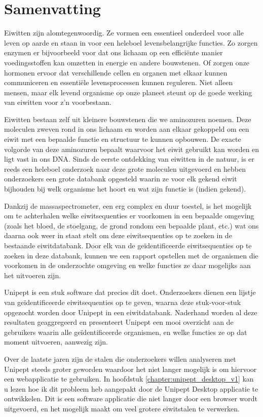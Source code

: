 \chapter*{Samenvatting}

Eiwitten zijn alomtegenwoordig.
Ze vormen een essentieel onderdeel voor alle leven op aarde en staan in voor een heleboel levensbelangrijke functies.
Zo zorgen enzymen er bijvoorbeeld voor dat ons lichaam op een efficiënte manier voedingsstoffen kan omzetten in energie en andere bouwstenen.
Of zorgen onze hormonen ervoor dat verschillende cellen en organen met elkaar kunnen communiceren en essentiële levensprocessen kunnen reguleren.
Niet alleen mensen, maar elk levend organisme op onze planeet steunt op de goede werking van eiwitten voor z'n voorbestaan.

Eiwitten bestaan zelf uit kleinere bouwstenen die we aminozuren noemen.
Deze moleculen zweven rond in ons lichaam en worden aan elkaar gekoppeld om een eiwit met een bepaalde functie en structuur te kunnen opbouwen.
De exacte volgorde van deze aminozuren bepaalt waarvoor het eiwit gebruikt kan worden en ligt vast in ons DNA.
Sinds de eerste ontdekking van eiwitten in de natuur, is er reeds een heleboel onderzoek naar deze grote moleculen uitgevoerd en hebben onderzoekers een grote databank opgesteld waarin ze voor elk gekend eiwit bijhouden bij welk organisme het hoort en wat zijn functie is (indien gekend).

Dankzij de massaspectrometer, een erg complex en duur toestel, is het mogelijk om te achterhalen welke eiwitsequenties er voorkomen in een bepaalde omgeving (zoals het bloed, de stoelgang, de grond rondom een bepaalde plant, etc.) wat ons daarna ook weer in staat stelt om deze eiwitsequenties op te zoeken in de bestaande eiwitdatabank.
Door elk van de geïdentificeerde eiwitsequenties op te zoeken in deze databank, kunnen we een rapport opstellen met de organismen die voorkomen in de onderzochte omgeving en welke functies ze daar mogelijks aan het uitvoeren zijn.

Unipept is een stuk software dat precies dit doet.
Onderzoekers dienen een lijstje van geïdentificeerde eiwitsequenties op te geven, waarna deze stuk-voor-stuk opgezocht worden door Unipept in een eiwitdatabank.
Naderhand worden al deze resultaten geaggregeerd en presenteert Unipept een mooi overzicht aan de gebruikers waarin alle geïdentificeerde organismen, en welke functies ze op dat moment uitvoeren, aanwezig zijn.

Over de laatste jaren zijn de stalen die onderzoekers willen analyseren met Unipept steeds groter geworden waardoor het niet langer mogelijk is om hiervoor een webapplicatie te gebruiken.
In hoofdstuk \ref{chapter:unipept_desktop_v1} kan u lezen hoe ik dit probleem heb aangepakt door de Unipept Desktop applicatie te ontwikkelen.
Dit is een software applicatie die niet langer door een browser wordt uitgevoerd, en het mogelijk maakt om veel grotere eiwitstalen te verwerken.
